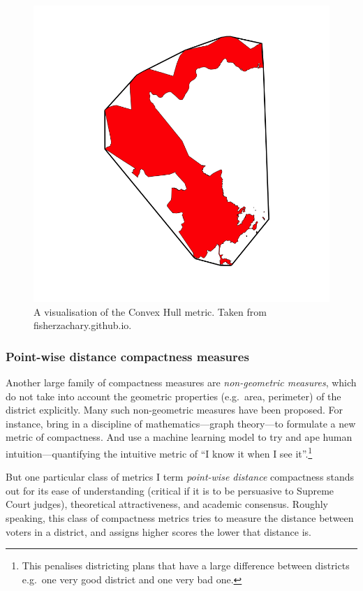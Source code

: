 \documentclass[]{article}
\begin{document}
\begin{figure}
\centering
\includegraphics{img/ch.png}
\caption{A visualisation of the Convex Hull metric. Taken from
fisherzachary.github.io.}
\end{figure}

\hypertarget{point-wise-distance-compactness-measures}{%
\subsubsection{Point-wise distance compactness
measures}\label{point-wise-distance-compactness-measures}}

Another large family of compactness measures are \emph{non-geometric
measures}, which do not take into account the geometric properties
(e.g.~area, perimeter) of the district explicitly. Many such
non-geometric measures have been proposed. For instance, \cite{dc2016}
bring in a discipline of mathematics---graph theory---to formulate a new
metric of compactness. And \cite{kingwp} use a machine learning model to
try and ape human intuition---quantifying the intuitive metric of ``I
know it when I see it''.\footnote{This penalises districting plans that
  have a large difference between districts e.g.~one very good district
  and one very bad one.}

But one particular class of metrics I term \emph{point-wise distance}
compactness stands out for its ease of understanding (critical if it is
to be persuasive to Supreme Court judges), theoretical attractiveness,
and academic consensus. Roughly speaking, this class of compactness
metrics tries to measure the distance between voters in a district, and
assigns higher scores the lower that distance is.
\end{document}
